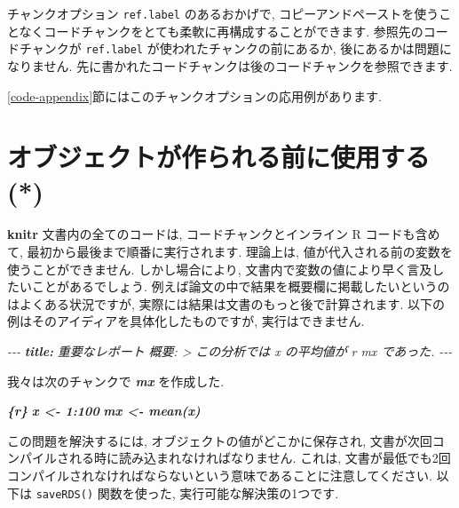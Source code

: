 \documentclass[
  11pt,
  lualatex,
  ja=standard]{bxjsreport}
\newenvironment{Shaded}{\begin{snugshade}}{\end{snugshade}}
\newcommand{\AnnotationTok}[1]{\textcolor[rgb]{0.56,0.35,0.01}{\textbf{\textit{#1}}}}
\newcommand{\CommentTok}[1]{\textcolor[rgb]{0.56,0.35,0.01}{\textit{#1}}}
\newcommand{\InformationTok}[1]{\textcolor[rgb]{0.56,0.35,0.01}{\textbf{\textit{#1}}}}
\newcommand{\NormalTok}[1]{#1}
\begin{document}
チャンクオプション \texttt{ref.label} のあるおかげで, コピーアンドペーストを使うことなくコードチャンクをとても柔軟に再構成することができます. 参照先のコードチャンクが \texttt{ref.label} が使われたチャンクの前にあるか, 後にあるかは問題になりません. 先に書かれたコードチャンクは後のコードチャンクを参照できます.

\ref{code-appendix}節にはこのチャンクオプションの応用例があります.

\hypertarget{load-cache}{%
\section{オブジェクトが作られる前に使用する (*)}\label{load-cache}}

\textbf{knitr} 文書内の全てのコードは, コードチャンクとインライン R コードも含めて, 最初から最後まで順番に実行されます. 理論上は, 値が代入される前の変数を使うことができません. しかし場合により, 文書内で変数の値により早く言及したいことがあるでしょう. 例えば論文の中で結果を概要欄に掲載したいというのはよくある状況ですが, 実際には結果は文書のもっと後で計算されます. 以下の例はそのアイディアを具体化したものですが, 実行はできません.

\begin{Shaded}
\begin{Highlighting}[]
\CommentTok{{-}{-}{-}}
\AnnotationTok{title:}\CommentTok{ 重要なレポート}
\CommentTok{概要: \textgreater{}}
\CommentTok{  この分析では \textasciigrave{}x\textasciigrave{} の平均値が}
\CommentTok{  \textasciigrave{}r mx\textasciigrave{} であった.}
\CommentTok{{-}{-}{-}}

\NormalTok{我々は次のチャンクで }\InformationTok{\textasciigrave{}mx\textasciigrave{}}\NormalTok{ を作成した.}

\InformationTok{\textasciigrave{}\textasciigrave{}\textasciigrave{}\{r\}}
\InformationTok{x \textless{}{-} 1:100}
\InformationTok{mx \textless{}{-} mean(x)}
\InformationTok{\textasciigrave{}\textasciigrave{}\textasciigrave{}}
\end{Highlighting}
\end{Shaded}

この問題を解決するには, オブジェクトの値がどこかに保存され, 文書が次回コンパイルされる時に読み込まれなければなりません. これは, 文書が最低でも2回コンパイルされなければならないという意味であることに注意してください. 以下は \texttt{saveRDS()} 関数を使った, 実行可能な解決策の1つです.
\end{document}
